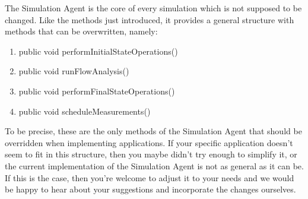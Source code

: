 \documentclass[11pt,fleqn]{book} %
\newcommand{\MainAgent}{Simulation Agent}
\begin{document}
The \MainAgent{} is the core of every simulation which is not supposed to be changed. Like the methods just introduced, it provides a general structure with methods that can be overwritten, namely:
\begin{enumerate}
	\item public void performInitialStateOperations()
	\item public void runFlowAnalysis()
	\item public void performFinalStateOperations()
	\item public void scheduleMeasurements()
\end{enumerate}

To be precise, these are the only methods of the \MainAgent{} that should be overridden when implementing applications. If your specific application doesn’t seem to fit in this structure, then you maybe didn’t try enough to simplify it, or the current implementation of the \MainAgent{} is not as general as it can be. If this is the case, then you’re welcome to adjust it to your needs and we would be happy to hear about your suggestions and incorporate the changes ourselves.
\end{document}
